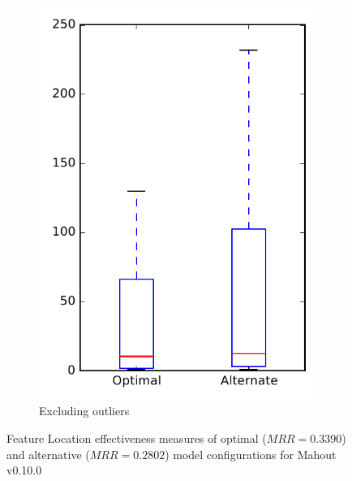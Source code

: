 \begin{figure}
\begin{subfigure}{.4\textwidth}
        \includegraphics[height=0.4\textheight]{figures/combo/flt_rq1_mahout_no_outlier}
        \caption{Excluding outliers}\label{fig:combo:flt:rq1:mahout_no_outlier}
    \end{subfigure}
\caption[Feature Location effectiveness measures of optimal and alternative model configurations for Mahout v0.10.0]%
{Feature Location effectiveness measures of optimal ($MRR=0.3390$) and alternative ($MRR=0.2802$) model configurations for Mahout v0.10.0}
\label{fig:combo:flt:rq1:mahout}
\end{figure}
